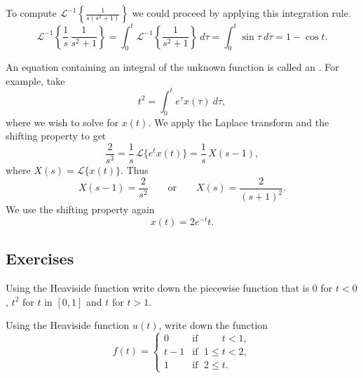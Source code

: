 \begin{example}
To compute ${\mathcal{L}}^{-1} \left\{\frac{1}{s(s^2+1)}\right\}$ we could
proceed by applying this integration rule.  
\begin{equation*}
{\mathcal{L}}^{-1} \left\{
\frac{1}{s} \, \frac{1}{s^2+1} \right\} 
=
\int_0^t 
{\mathcal{L}}^{-1} \left\{
\frac{1}{s^2+1} \right\} ~ d\tau
=
\int_0^t 
\sin \tau ~ d\tau
=
1 - \cos t .
\end{equation*}
\end{example}

\begin{example}
An equation containing an integral of the unknown function is
called an \emph{}.  For example, take
\begin{equation*}
t^2 = \int_0^t e^{\tau} x(\tau) ~d\tau ,
\end{equation*}
where we wish to solve for $x(t)$.
We apply the Laplace transform and the shifting property to get
\begin{equation*}
\frac{2}{s^3} = \frac{1}{s} \, \mathcal{L} \bigl\{ e^{t} x(t) \bigr\}
=
\frac{1}{s} \, X(s-1) ,
\end{equation*}
where $X(s) = \mathcal{L} \bigl\{ x(t) \bigr\}$.  Thus
\begin{equation*}
X(s-1) =
\frac{2}{s^2} \qquad \text{or} \qquad
X(s) =
\frac{2}{{(s+1)}^2}.
\end{equation*}
We use the shifting property again
\begin{equation*}
x(t) = 2 e^{-t} t .
\end{equation*}
\end{example}

\subsection{Exercises}

\begin{exercise}
Using the Heaviside function write down the piecewise function
that is 0 for $t < 0$, $t^2$ for $t$ in $[0,1]$ and $t$ for $t > 1$.
\end{exercise}

\begin{exercise}\ansMark%
Using the Heaviside function $u(t)$, write down the function
\begin{equation*}
f(t) =
\begin{cases}
0 & \text{if } \; \phantom{1 \leq {}} t < 1  , \\
t-1 & \text{if } \; 1 \leq t < 2 , \\
1 & \text{if } \; 2 \leq t .
\end{cases}
\end{equation*}
\end{exercise}

